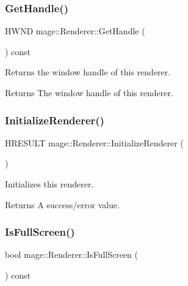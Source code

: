 \subsubsection{\texorpdfstring{Get\+Handle()}{GetHandle()}}
{\footnotesize\ttfamily H\+W\+ND mage\+::\+Renderer\+::\+Get\+Handle (\begin{DoxyParamCaption}{ }\end{DoxyParamCaption}) const}

Returns the window handle of this renderer.

\begin{DoxyReturn}{Returns}
The window handle of this renderer. 
\end{DoxyReturn}
\hypertarget{classmage_1_1_renderer_aafed50e7e14ca597541c091941351929}{}\label{classmage_1_1_renderer_aafed50e7e14ca597541c091941351929} 
\subsubsection{\texorpdfstring{Initialize\+Renderer()}{InitializeRenderer()}}
{\footnotesize\ttfamily H\+R\+E\+S\+U\+LT mage\+::\+Renderer\+::\+Initialize\+Renderer (\begin{DoxyParamCaption}{ }\end{DoxyParamCaption})\hspace{0.3cm}{\ttfamily [protected]}}

Initializes this renderer.

\begin{DoxyReturn}{Returns}
A success/error value. 
\end{DoxyReturn}
\hypertarget{classmage_1_1_renderer_a5ae3220e19c68f47a8e4d55e3ced4694}{}\label{classmage_1_1_renderer_a5ae3220e19c68f47a8e4d55e3ced4694} 
\subsubsection{\texorpdfstring{Is\+Full\+Screen()}{IsFullScreen()}}
{\footnotesize\ttfamily bool mage\+::\+Renderer\+::\+Is\+Full\+Screen (\begin{DoxyParamCaption}{ }\end{DoxyParamCaption}) const}

